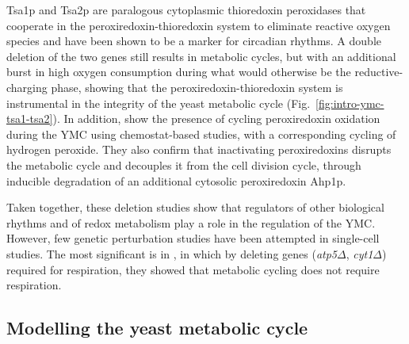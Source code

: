 Tsa1p and Tsa2p are paralogous cytoplasmic thioredoxin peroxidases that cooperate in the peroxiredoxin-thioredoxin system to eliminate reactive oxygen species and have been shown to be a marker for circadian rhythms.
A double deletion of the two genes still results in metabolic cycles, but with an additional burst in high oxygen consumption during what would otherwise be the reductive-charging phase, showing that the peroxiredoxin-thioredoxin system is instrumental in the integrity of the yeast metabolic cycle (Fig.\ \ref{fig:intro-ymc-tsa1-tsa2}).
In addition, \textcite{amponsahPeroxiredoxinsCoupleMetabolism2021} show the presence of cycling peroxiredoxin oxidation during the YMC using chemostat-based studies, with a corresponding cycling of hydrogen peroxide.
They also confirm that inactivating peroxiredoxins disrupts the metabolic cycle and decouples it from the cell division cycle, through inducible degradation of an additional cytosolic peroxiredoxin Ahp1p.

Taken together, these deletion studies show that regulators of other biological rhythms and of redox metabolism play a role in the regulation of the YMC\@.
However, few genetic perturbation studies have been attempted in single-cell studies.
The most significant is in \textcite{baumgartnerFlavinbasedMetabolicCycles2018}, in which by deleting genes (\textit{atp5$\Delta$}, \textit{cyt1$\Delta$}) required for respiration, they showed that metabolic cycling does not require respiration.

\subsection{Modelling the yeast metabolic cycle}
\label{subsec:intro-ymc-model}



